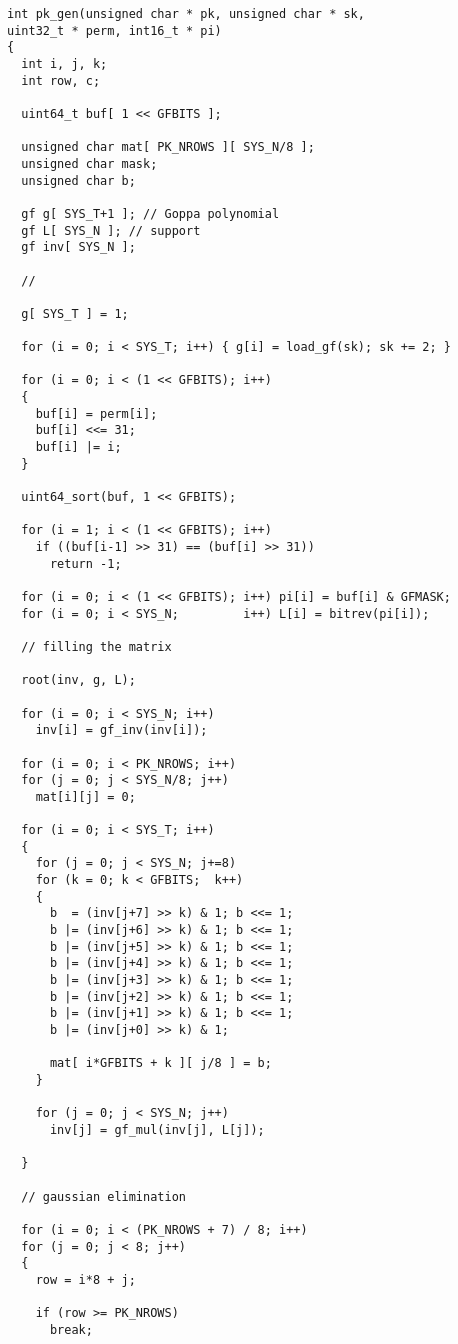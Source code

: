 \begin{verbatim}
int pk_gen(unsigned char * pk, unsigned char * sk,
uint32_t * perm, int16_t * pi)
{
  int i, j, k;
  int row, c;

  uint64_t buf[ 1 << GFBITS ];

  unsigned char mat[ PK_NROWS ][ SYS_N/8 ];
  unsigned char mask;
  unsigned char b;

  gf g[ SYS_T+1 ]; // Goppa polynomial
  gf L[ SYS_N ]; // support
  gf inv[ SYS_N ];

  //

  g[ SYS_T ] = 1;

  for (i = 0; i < SYS_T; i++) { g[i] = load_gf(sk); sk += 2; }

  for (i = 0; i < (1 << GFBITS); i++)
  {
    buf[i] = perm[i];
    buf[i] <<= 31;
    buf[i] |= i;
  }

  uint64_sort(buf, 1 << GFBITS);

  for (i = 1; i < (1 << GFBITS); i++)
    if ((buf[i-1] >> 31) == (buf[i] >> 31))
      return -1;

  for (i = 0; i < (1 << GFBITS); i++) pi[i] = buf[i] & GFMASK;
  for (i = 0; i < SYS_N;         i++) L[i] = bitrev(pi[i]);

  // filling the matrix

  root(inv, g, L);
    
  for (i = 0; i < SYS_N; i++)
    inv[i] = gf_inv(inv[i]);

  for (i = 0; i < PK_NROWS; i++)
  for (j = 0; j < SYS_N/8; j++)
    mat[i][j] = 0;

  for (i = 0; i < SYS_T; i++)
  {
    for (j = 0; j < SYS_N; j+=8)
    for (k = 0; k < GFBITS;  k++)
    {
      b  = (inv[j+7] >> k) & 1; b <<= 1;
      b |= (inv[j+6] >> k) & 1; b <<= 1;
      b |= (inv[j+5] >> k) & 1; b <<= 1;
      b |= (inv[j+4] >> k) & 1; b <<= 1;
      b |= (inv[j+3] >> k) & 1; b <<= 1;
      b |= (inv[j+2] >> k) & 1; b <<= 1;
      b |= (inv[j+1] >> k) & 1; b <<= 1;
      b |= (inv[j+0] >> k) & 1;

      mat[ i*GFBITS + k ][ j/8 ] = b;
    }

    for (j = 0; j < SYS_N; j++)
      inv[j] = gf_mul(inv[j], L[j]);

  }

  // gaussian elimination

  for (i = 0; i < (PK_NROWS + 7) / 8; i++)
  for (j = 0; j < 8; j++)
  {
    row = i*8 + j;      

    if (row >= PK_NROWS)
      break;


\end{verbatim}
